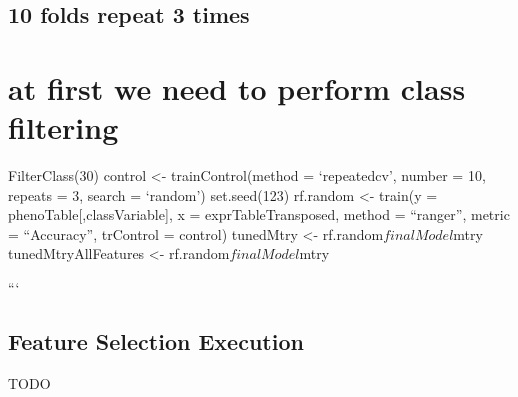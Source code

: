 \documentclass[]{article}
\begin{document}
\hypertarget{folds-repeat-3-times}{%
\subsection{10 folds repeat 3 times}\label{folds-repeat-3-times}}

\hypertarget{at-first-we-need-to-perform-class-filtering}{%
\section{at first we need to perform class
filtering}\label{at-first-we-need-to-perform-class-filtering}}

FilterClass(30) control \textless{}- trainControl(method = `repeatedcv',
number = 10, repeats = 3, search = `random') set.seed(123) rf.random
\textless{}- train(y = phenoTable{[},classVariable{]}, x =
exprTableTransposed, method = ``ranger'', metric = ``Accuracy'',
trControl = control) tunedMtry \textless{}- rf.random\(finalModel\)mtry
tunedMtryAllFeatures \textless{}- rf.random\(finalModel\)mtry

```

\hypertarget{feature-selection-execution}{%
\subsection{Feature Selection
Execution}\label{feature-selection-execution}}

TODO
\end{document}
